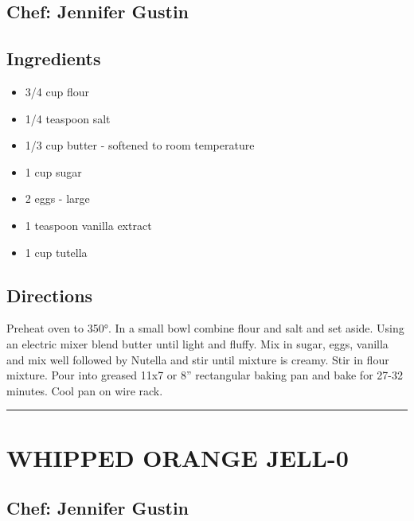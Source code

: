 \documentclass[
]{book}
\providecommand{\tightlist}{%
  \setlength{\itemsep}{0pt}\setlength{\parskip}{0pt}}
\begin{document}
\hypertarget{chef-jennifer-gustin-11}{%
\subsection*{Chef: Jennifer Gustin}\label{chef-jennifer-gustin-11}}


\hypertarget{ingredients-85}{%
\subsection*{Ingredients}\label{ingredients-85}}


\begin{itemize}
\tightlist
\item
  3/4 cup flour
\item
  1/4 teaspoon salt
\item
  1/3 cup butter - softened to room temperature
\item
  1 cup sugar
\item
  2 eggs - large
\item
  1 teaspoon vanilla extract
\item
  1 cup tutella
\end{itemize}

\hypertarget{directions-85}{%
\subsection*{Directions}\label{directions-85}}


Preheat oven to 350°. In a small bowl combine flour and salt and set aside. Using an electric mixer blend butter until light and fluffy. Mix in sugar, eggs, vanilla and mix well followed by Nutella and stir until mixture is creamy. Stir in flour mixture. Pour into greased 11x7 or 8'' rectangular baking pan and bake for 27-32 minutes. Cool pan on wire rack.

\begin{center}\rule{0.5\linewidth}{0.5pt}\end{center}

\hypertarget{whipped-orange-jell-0}{%
\section*{WHIPPED ORANGE JELL-0}\label{whipped-orange-jell-0}}


\hypertarget{chef-jennifer-gustin-12}{%
\subsection*{Chef: Jennifer Gustin}\label{chef-jennifer-gustin-12}}
\end{document}
